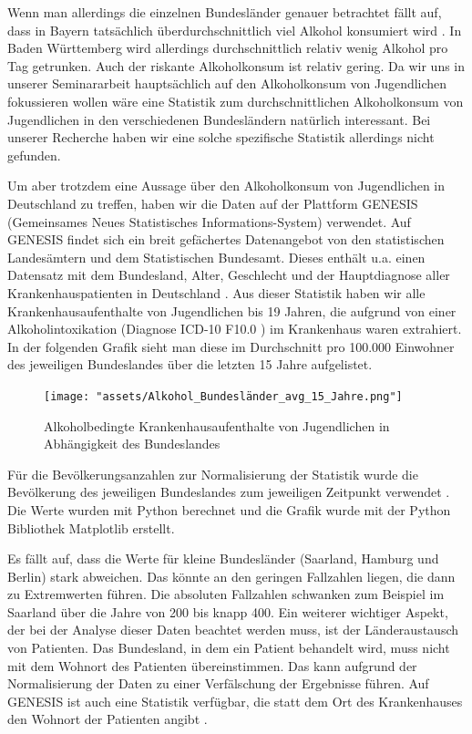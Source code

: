 \documentclass[12pt]{article}
\begin{document}
Wenn man allerdings die einzelnen Bundesländer genauer betrachtet fällt auf, dass in Bayern tatsächlich überdurchschnittlich viel Alkohol konsumiert wird \autocite{kraus_einfluss_2001}. In Baden Württemberg wird allerdings durchschnittlich relativ wenig Alkohol pro Tag getrunken. Auch der riskante Alkoholkonsum ist relativ gering. Da wir uns in unserer Seminararbeit hauptsächlich auf den Alkoholkonsum von Jugendlichen fokussieren wollen wäre eine Statistik zum durchschnittlichen Alkoholkonsum von Jugendlichen in den verschiedenen Bundesländern natürlich interessant. Bei unserer Recherche haben wir eine solche spezifische Statistik allerdings nicht gefunden. 

Um aber trotzdem eine Aussage über den Alkoholkonsum von Jugendlichen in Deutschland zu treffen, haben wir die Daten auf der Plattform GENESIS (Gemeinsames Neues Statistisches Informations-System) \autocite{noauthor_statistisches_nodate} verwendet. Auf GENESIS findet sich ein breit  gefächertes Datenangebot von den statistischen Landesämtern und dem Statistischen Bundesamt. Dieses enthält u.a. einen Datensatz mit dem Bundesland, Alter, Geschlecht und der Hauptdiagnose aller Krankenhauspatienten in Deutschland \autocite{noauthor_genesis_nodate}. Aus dieser Statistik haben wir alle Krankenhausaufenthalte von Jugendlichen bis 19 Jahren, die aufgrund von einer Alkoholintoxikation (Diagnose ICD-10 F10.0 \autocite{noauthor_icd-10-code_nodate}) im Krankenhaus waren extrahiert. In der folgenden Grafik sieht man diese im Durchschnitt pro 100.000 Einwohner des jeweiligen Bundeslandes über die letzten 15 Jahre aufgelistet.

\begin{figure}[H]
    \centering
    \texttt{[image: "assets/Alkohol\_Bundesländer\_avg\_15\_Jahre.png"]}
    \caption{Alkoholbedingte Krankenhausaufenthalte von Jugendlichen in Abhängigkeit des Bundeslandes}
    \label{fig:Krankenhausaufenthalte_1}
\end{figure}

Für die Bevölkerungsanzahlen zur Normalisierung der Statistik wurde die Bevölkerung des jeweiligen Bundeslandes zum jeweiligen Zeitpunkt verwendet \autocite{noauthor_statistisches_2024}. Die Werte wurden mit Python berechnet und die Grafik wurde mit der Python Bibliothek Matplotlib \autocite{noauthor_matplotlib_nodate} erstellt. 

Es fällt auf, dass die Werte für kleine Bundesländer (Saarland, Hamburg und Berlin) stark abweichen. Das könnte an den geringen Fallzahlen liegen, die dann zu Extremwerten führen. Die absoluten Fallzahlen schwanken zum Beispiel im Saarland über die Jahre von 200 bis knapp 400. Ein weiterer wichtiger Aspekt, der bei der Analyse dieser Daten beachtet werden muss, ist der Länderaustausch von Patienten. Das Bundesland, in dem ein Patient behandelt wird, muss nicht mit dem Wohnort des Patienten übereinstimmen. Das kann aufgrund der Normalisierung der Daten zu einer Verfälschung der Ergebnisse führen. Auf GENESIS ist auch eine Statistik verfügbar, die statt dem Ort des Krankenhauses den Wohnort der Patienten angibt \autocite{noauthor_genesis_nodate-1}.
\end{document}
